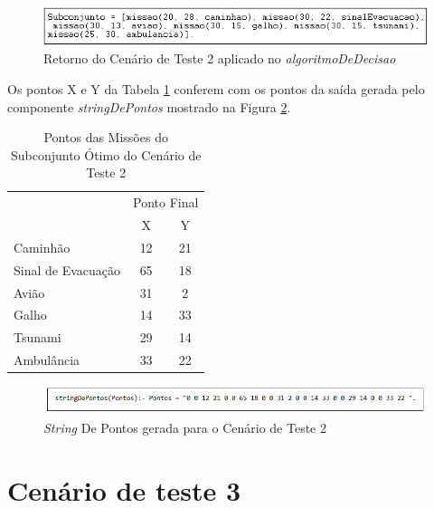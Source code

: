 \FloatBarrier
\begin{figure}[!h]
\centering
\includegraphics[keepaspectratio=true,scale=0.7]{figuras/resultado2.png}
\caption{Retorno do Cenário de Teste 2 aplicado no \textit{algoritmoDeDecisao}}
\label{resultado2}
\end{figure}

	Os pontos X e Y da Tabela \ref{pontoCT2} conferem com os pontos da saída gerada pelo componente \textit{stringDePontos} mostrado na Figura \ref{stringCT2}.

\begin{table}[!h]
\centering
\caption{Pontos das Missões do Subconjunto Ótimo do Cenário de Teste 2}
\label{pontoCT2}
\begin{tabular}{lcc}
\rowcolor[HTML]{00D2CB} 
\multicolumn{1}{c}{\cellcolor[HTML]{00D2CB}} & \multicolumn{2}{l}{\cellcolor[HTML]{00D2CB}Ponto Final} \\ 
\rowcolor[HTML]{C0F2F0} 
\multicolumn{1}{c}{\cellcolor[HTML]{00D2CB}Missão} & \multicolumn{1}{c}{\cellcolor[HTML]{C0F2F0}X} & \multicolumn{1}{c}{\cellcolor[HTML]{C0F2F0}Y} \\
 Caminhão & 12 & 21 \\
 Sinal de Evacuação & 65 & 18 \\
 Avião & 31 & 2 \\
 Galho & 14 & 33 \\
 Tsunami & 29 & 14 \\
 Ambulância & 33 & 22 \\          
\end{tabular}
\end{table}


\FloatBarrier
\begin{figure}[!h]
\centering
\includegraphics[keepaspectratio=true,scale=0.7]{figuras/stringCT2.png}
\caption{\textit{String} De Pontos gerada para o Cenário de Teste 2}
\label{stringCT2}
\end{figure}



\section{Cenário de teste 3}


